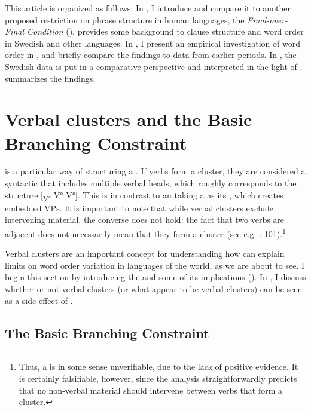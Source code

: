 \documentclass[output=paper, colorlinks, citecolor=brown]{langscibook}
\begin{document}
This article is organized as follows: In , I introduce  and compare it to another proposed restriction on phrase structure in human languages, the \textit{Final-over-Final Condition} (\citealt{BiberauerEtAl2014,SheehanEtAl2017}).  provides some background to clause structure and  word order in Swedish and other  languages. In , I present an empirical investigation of  word order in , and briefly compare the findings to data from earlier periods. In , the Swedish data is put in a comparative perspective and interpreted in the light of .  summarizes the findings.


\section{Verbal clusters and the Basic Branching Constraint}\label{sec:sangfelt:2}

 is a particular way of structuring a . If verbs form a cluster, they are considered a syntactic  that includes multiple verbal heads, which roughly corresponds to the structure [\textsubscript{V°} V° V°]. This is in contrast to an  taking a  as its , which creates embedded VPs. It is important to note that while verbal clusters exclude intervening material, the converse does not hold: the fact that two verbs are adjacent does not necessarily mean that they form a cluster (see e.g. \citealt{Sheehan2017Final}: 101).\footnote{Thus, a  is in some sense unverifiable, due to the lack of positive evidence. It is certainly falsifiable, however, since the analysis straightforwardly predicts that no non-verbal material should intervene between verbs that form a cluster.}


Verbal clusters are an important concept for understanding how  can explain limits on word order variation in languages of the world, as we are about to see. I begin this section by introducing the  and some of its implications (). In , I discuss whether or not verbal clusters (or what appear to be verbal clusters) can be seen as a side effect of .


\subsection{The Basic Branching Constraint}\label{sec:sangfelt:2.1}
\end{document}
